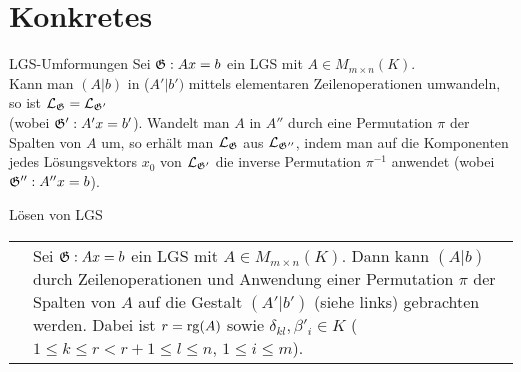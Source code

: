 \pagebreak

\section{%
    Konkretes%
}

\begin{Satz}{LGS-Umformungen}
    Sei $\mathfrak{G}: Ax = b$ ein LGS mit $A \in M_{m \times n}(K)$. \\
    Kann man $(A|b)$ in ($A'|b')$ mittels elementaren Zeilenoperationen
    umwandeln, so ist $\mathcal{L}_{\mathfrak{G}} = \mathcal{L}_{\mathfrak{G'}}$ \\
    (wobei $\mathfrak{G'}: A'x = b'$).
    Wandelt man $A$ in $A''$ durch eine Permutation $\pi$ der Spalten von $A$
    um, so erhält man $\mathcal{L}_{\mathfrak{G}}$ aus $\mathcal{L}_{\mathfrak{G''}}$, indem man auf die
    Komponenten jedes Lösungsvektors $x_0$ von $\mathcal{L}_{\mathfrak{G'}}$ die inverse
    Permutation $\pi^{-1}$ anwendet (wobei $\mathfrak{G''}: A''x = b$).
\end{Satz}

\begin{Satz}{Lösen von LGS} \\
    \begin{tabular}{p{6.8cm}p{9.2cm}}
    \matrixsize{$\left(\begin{array}{ccccccc|c}
    1 & 0 & \cdots & 0 &
    \delta_{1, r+1} & \cdots & \delta_{1, n} & \beta'_1 \\
    0 & 1 & \cdots & 0 &
    \delta_{2, r+1} & \cdots & \delta_{2, n} & \beta'_2 \\
    \vdots & \vdots & \ddots & \vdots & \vdots & & \vdots & \vdots \\
    0 & 0 & \cdots & 1 &
    \delta_{r, r+1} & \cdots & \delta_{r, n} & \beta'_r \\
    0 & 0 & \cdots & 0 & 0 & \cdots & 0 & \beta'_{r+1} \\
    \vdots & \vdots & & \vdots & \vdots & & \vdots & \vdots \\
    0 & 0 & \cdots & 0 & 0 & \cdots & 0 & \beta'_m \end{array}\right)$}
    &
    \begin{minipage}[c]{9.2cm}
    Sei $\mathfrak{G}: Ax = b$ ein LGS mit $A \in M_{m \times n}(K)$.
    Dann kann $(A|b)$ durch Zeilenoperationen und Anwendung einer Permutation
    $\pi$ der Spalten von $A$ auf die Gestalt $(A'|b')$ (siehe links)
    gebrachten werden.
    Dabei ist $r = \operatorname{rg}(A)$ sowie $\delta_{kl}, \beta'_i \in K$
    ($1 \le k \le r < r+1 \le l \le n$, $1 \le i \le m$).
    \end{minipage}\end{tabular}
\end{Satz}

